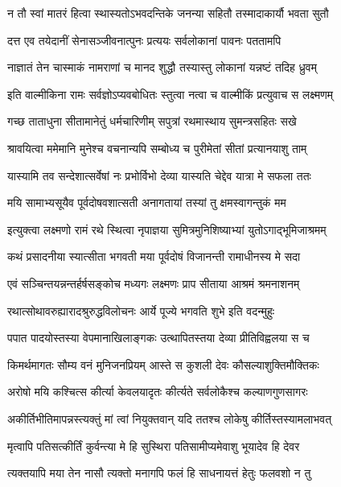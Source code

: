 \twolineshloka
{न तौ स्वां मातरं हित्वा स्थास्यतोऽभवदन्तिके}
{जनन्या सहितौ तस्मादाकार्यौ भवता सुतौ}%

\twolineshloka
{दत्त एव तयेदानीं सेनासञ्जीवनात्पुनः}
{प्रत्ययः सर्वलोकानां पावनः पततामपि}%

\twolineshloka
{नाज्ञातं तेन चास्माकं नामराणां च मानद}
{शुद्धौ तस्यास्तु लोकानां यन्नष्टं तदिह ध्रुवम्}%


\twolineshloka
{इति वाल्मीकिना रामः सर्वज्ञोऽप्यवबोधितः}
{स्तुत्वा नत्वा च वाल्मीकिं प्रत्युवाच स लक्ष्मणम्}%

\twolineshloka
{गच्छ ताताधुना सीतामानेतुं धर्मचारिणीम्}
{सपुत्रां रथमास्थाय सुमन्त्रसहितः सखे}%

\twolineshloka
{श्रावयित्वा ममेमानि मुनेश्च वचनान्यपि}
{सम्बोध्य च पुरीमेतां सीतां प्रत्यानयाशु ताम्}%


\twolineshloka
{यास्यामि तव सन्देशात्सर्वेषां नः प्रभोर्विभो}
{देव्या यास्यति चेद्देव यात्रा मे सफला ततः}%

\twolineshloka
{मयि सामाभ्यसूयैव पूर्वदोषवशात्सती}
{अनागतायां तस्यां तु क्षमस्वागन्तुकं मम}%

\twolineshloka
{इत्युक्त्वा लक्ष्मणो रामं रथे स्थित्वा नृपाज्ञया}
{सुमित्रमुनिशिष्याभ्यां युतोऽगाद्भूमिजाश्रमम्}%

\twolineshloka
{कथं प्रसादनीया स्यात्सीता भगवती मया}
{पूर्वदोषं विजानन्ती रामाधीनस्य मे सदा}%

\twolineshloka
{एवं सञ्चिन्तयन्नन्तर्हर्षसङ्कोच मध्यगः}
{लक्ष्मणः प्राप सीताया आश्रमं श्रमनाशनम्}%

\twolineshloka
{रथात्सोथावरुह्यारादश्रुरुद्धविलोचनः}
{आर्ये पूज्ये भगवति शुभे इति वदन्मुहुः}%

\twolineshloka
{पपात पादयोस्तस्या वेपमानाखिलाङ्गकः}
{उत्थापितस्तया देव्या प्रीतिविह्वलया स च}%

\twolineshloka
{किमर्थमागतः सौम्य वनं मुनिजनप्रियम्}
{आस्ते स कुशली देवः कौसल्याशुक्तिमौक्तिकः}%

\twolineshloka
{अरोषो मयि कश्चित्स कीर्त्या केवलयादृतः}
{कीर्त्यते सर्वलोकैश्च कल्याणगुणसागरः}%

\twolineshloka
{अकीर्तिभीतिमापन्नस्त्यक्तुं मां त्वां नियुक्तवान्}
{यदि ततश्च लोकेषु कीर्तिस्तस्यामलाभवत्}%

\twolineshloka
{मृत्वापि पतिसत्कीर्तिं कुर्वन्त्या मे हि सुस्थिरा}
{पतिसामीप्यमेवाशु भूयादेव हि देवर}%

\twolineshloka
{त्यक्तयापि मया तेन नासौ त्यक्तो मनागपि}
{फलं हि साधनायत्तं हेतुः फलवशो न तु}%

